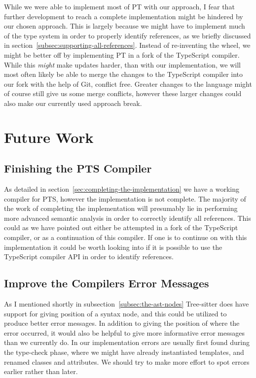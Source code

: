 While we were able to implement most of PT with our approach, I fear that further development to reach a complete implementation might be hindered by our chosen approach.
This is largely because we might have to implement much of the type system in order to properly identify references, as we briefly discussed in section~\vref{subsec:supporting-all-references}.
Instead of re-inventing the wheel, we might be better off by implementing PT in a fork of the TypeScript compiler.
While this \textit{might} make updates harder, than with our implementation, we will most often likely be able to merge the changes to the TypeScript compiler into our fork with the help of Git, conflict free.
Greater changes to the language might of course still give us some merge conflicts, however these larger changes could also make our currently used approach break.

\section{Future Work}\label{sec:future-work}

\subsection{Finishing the PTS Compiler}\label{subsec:finishing-the-pts-compiler}

As detailed in section~\vref{sec:completing-the-implementation} we have a working compiler for PTS, however the implementation is not complete.
The majority of the work of completing the implementation will presumably lie in performing more advanced semantic analysis in order to correctly identify all references.
This could as we have pointed out either be attempted in a fork of the TypeScript compiler, or as a continuation of this compiler.
If one is to continue on with this implementation it could be worth looking into if it is possible to use the TypeScript compiler API in order to identify references.

\subsection{Improve the Compilers Error Messages}\label{subsec:compiler-with-focus-on-error-messages}

As I mentioned shortly in subsection~\vref{subsec:the-ast-nodes} Tree-sitter does have support for giving position of a syntax node, and this could be utilized to produce better error messages.
In addition to giving the position of where the error occurred, it would also be helpful to give more informative error messages than we currently do.
In our implementation errors are usually first found during the type-check phase, where we might have already instantiated templates, and renamed classes and attributes.
We should try to make more effort to spot errors earlier rather than later.

